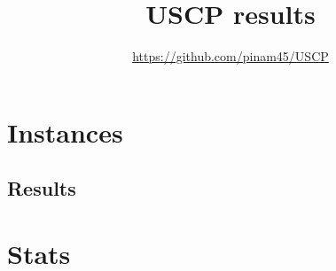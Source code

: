 \documentclass[12pt,a4paper,twoside]{article}
\title{USCP results}
\author{\url{https://github.com/pinam45/USCP}}
\date{\DTMusedate{generated} \DTMusetime{generated}}
\begin{document}
	\maketitle{}
	\tableofcontents{}
	\listoftables{}
	\newpage\section{Instances}
		
		
		
		
	\begin{landscape}
		\newpage\section{Results}
			
	\end{landscape}
	\newpage\section{Stats}
		
%			
\end{document}
